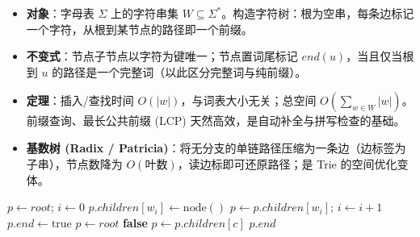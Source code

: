 \begin{itemize}
    \item \textbf{对象}：字母表 $\Sigma$ 上的字符串集 $W\subseteq\Sigma^*$。构造字符树：根为空串，每条边标记一个字符，从根到某节点的路径即一个前缀。
    \item \textbf{不变式}：节点子节点以字符为键唯一；节点置词尾标记 $end(u)$，当且仅当根到 $u$ 的路径是一个完整词（以此区分完整词与纯前缀）。
    \item \textbf{定理}：插入/查找时间 $O(|w|)$，与词表大小无关；总空间 $O(\sum_{w\in W}|w|)$。前缀查询、最长公共前缀 (LCP) 天然高效，是自动补全与拼写检查的基础。
    \item \textbf{基数树 (Radix / Patricia)}：将无分支的单链路径压缩为一条边（边标签为子串），节点数降为 $O(\text{叶数})$，读边标即可还原路径；是 Trie 的空间优化变体。
\end{itemize}

\begin{algorithm}[H]
\caption{字典树插入与查找规约}
\begin{algorithmic}[1]
    \State $p\gets root$; $i\gets0$
         $p.children[w_i]\gets\text{node}()$ \EndIf
        \State $p\gets p.children[w_i]$; $i\gets i+1$
    \EndWhile
    \State $p.end\gets\text{true}$
\EndProcedure
{}
    \State $p\gets root$
      \Return \textbf{false} \EndIf \State $p\gets p.children[c]$ \EndFor
    \State \Return $p.end$ 
\EndProcedure
\end{algorithmic}
\end{algorithm}

